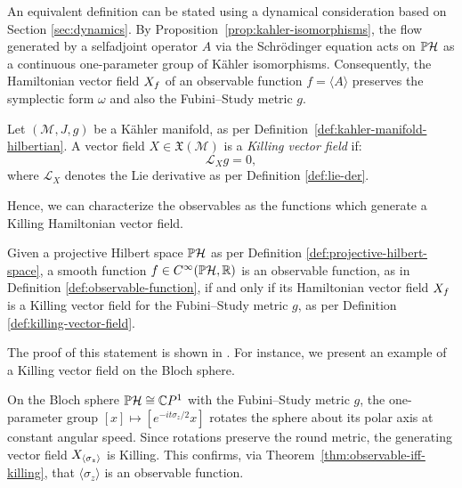 An equivalent definition can be stated using a dynamical consideration based on Section \ref{sec:dynamics}. By Proposition~\ref{prop:kahler-isomorphisms}, the flow generated by a selfadjoint operator $A$ via the Schrödinger equation acts on $\PH$ as a continuous one-parameter group of Kähler isomorphisms. Consequently, the Hamiltonian vector field $X_{f}$ of an observable function $f = \langle A \rangle$ preserves the symplectic form $\omega$ and also the Fubini--Study metric $g$.

\begin{definition}
	\label{def:killing-vector-field}
	Let $(\mathcal{M},J,g)$ be a Kähler manifold, as per Definition~\ref{def:kahler-manifold-hilbertian}. A vector field $X \in \mathfrak{X}(\mathcal{M})$ is a \emph{Killing vector field} if:
	\begin{equation}
		\mathcal{L}_X g = 0,
	\end{equation}
	where $\mathcal{L}_X$ denotes the Lie derivative as per Definition \ref{def:lie-der}.
\end{definition}

\noindent Hence, we can characterize the observables as the functions which generate a Killing Hamiltonian vector field.

\begin{theorem}
	\label{thm:observable-iff-killing}
	Given a projective Hilbert space $\PH$ as per Definition \ref{def:projective-hilbert-space}, a smooth function $f\in C^\infty(\PH,\R)$ is an observable function, as in Definition \ref{def:observable-function}, if and only if its Hamiltonian vector field $X_{f}$ is a Killing vector field for the Fubini--Study metric $g$, as per Definition \ref{def:killing-vector-field}.
\end{theorem}

\noindent The proof of this statement is shown in \cite[p.13]{ashtekarGeometricalFormulationQuantum1997}. For instance, we present an example of a Killing vector field on the Bloch sphere.

\begin{example}
	On the Bloch sphere $\PH\cong\C P^1$ with the Fubini--Study metric $g$,
	the one-parameter group $[x]\mapsto[e^{-it\sigma_z/2}x]$ rotates the
	sphere about its polar axis at constant angular speed. Since rotations
	preserve the round metric, the generating vector field
	$X_{\langle\sigma_z\rangle}$ is Killing. This confirms,
	via Theorem~\ref{thm:observable-iff-killing}, that $\langle\sigma_z\rangle$
	is an observable function.
\end{example}

